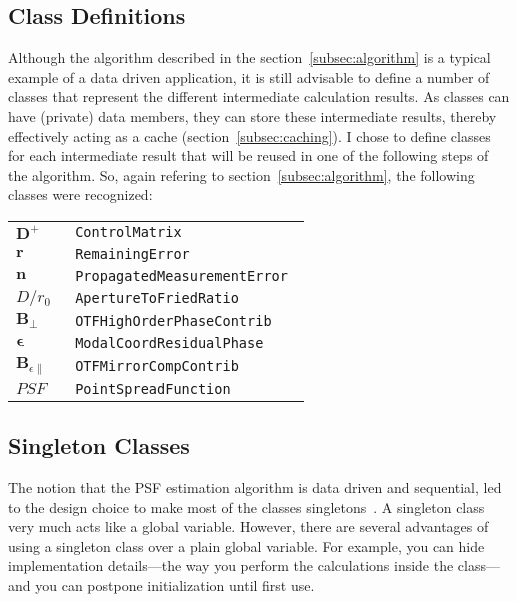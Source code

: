 \documentclass[a4paper]{article}
\begin{document}
\subsection{Class Definitions}
\label{subsec:defclass}
Although the algorithm described in the section~\ref{subsec:algorithm} is a
typical example of a data driven application, it is still advisable to define
a number of classes that represent the different intermediate calculation
results. As classes can have (private) data members, they can store these
intermediate results, thereby effectively acting as a cache
(section~\ref{subsec:caching}). I chose to define classes for each
intermediate result that will be reused in one of the following steps of the
algorithm. So, again refering to section~\ref{subsec:algorithm}, the following
classes were recognized:
\\[\baselineskip]
\begin{tabular}{l>{\tt}l}
$\mathbf{D}^+$                   & ControlMatrix                \\
$\mathbf{r}$                     & RemainingError               \\
$\mathbf{n}$                     & PropagatedMeasurementError   \\
$D/r_0$                          & ApertureToFriedRatio         \\
$\mathbf{B}_{\perp}$             & OTFHighOrderPhaseContrib     \\
$\boldsymbol{\epsilon}$          & ModalCoordResidualPhase      \\
$\mathbf{B}_{\epsilon\parallel}$ & OTFMirrorCompContrib         \\
$\mathit{PSF}$                   & PointSpreadFunction          \\
\end{tabular}


\subsection{Singleton Classes}
\label{subsec:singleton}
The notion that the PSF estimation algorithm is data driven and sequential,
led to the design choice to make most of the classes
singletons~\cite{gof95}. A singleton class very much acts like a global
variable. However, there are several advantages of using a singleton class
over a plain global variable. For example, you can hide implementation
details---the way you perform the calculations inside the class---and you
can postpone initialization until first use.
\end{document}
